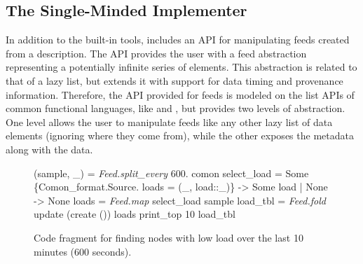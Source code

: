 

\subsection{The Single-Minded Implementer}

In addition to the built-in tools, \padsd{} includes an API for
manipulating feeds created from a description. The API provides the
user with a feed abstraction representing a potentially infinite
series of elements. This abstraction is related to that of a lazy
list, but extends it with support for data timing and provenance
information. Therefore, the API provided for feeds is modeled on the
list APIs of common functional languages, like \ocaml and \haskell,
but provides two levels of abstraction. One level allows the user to
manipulate feeds like any other lazy list of data elements (ignoring
where they come from), while the other exposes the metadata along with
the data. 



\begin{figure}[tb]
\begin{codebox}
 (sample, \_) = \textit{Feed.split_every} 600. comon 
 select_load = 
    Some \{Comon_format.Source.
          loads = (_, load::_)\} -> Some load
  | None -> None 
 loads    = \textit{Feed.map} select_load sample 
 load_tbl = \textit{Feed.fold} update (create ()) loads 
  print_top 10 load_tbl
\end{codebox}
  \caption{Code fragment for finding \planetlab nodes with low load
  over the last 10 minutes (600 seconds).  }
\label{fig:sample-loads}
\end{figure}



